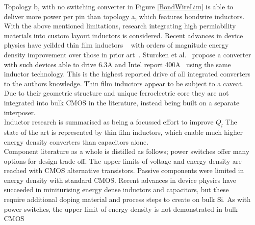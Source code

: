 \documentclass[letterpaper,twocolumn,10pt]{article}
\begin{document}
Topology b, with no switching converter in Figure \ref{BondWireLim} is able to deliver more power per pin than topology a, which features bondwire inductors.\\
\indent With the above mentioned limitations, research integrating high permiability materials into custom layout inductors is considered. Recent advances in device physics have yeilded thin film inductors ~\cite{OSulivan2013} with orders of magnitude energy density improvement over those in prior art~\cite{Meere2009}. Sturcken et al.~\cite{Sturcken2013} propose a converter with such devices able to drive 6.3A and Intel report 400A~\cite{Intel2010} using the same inductor technology. This is the highest reported drive of all integrated converters to the authors knowledge. Thin film inductors appear to be subject to a caveat. Due to their geometric structure and unique ferroelectric core they are not integrated into bulk CMOS in the literature, instead being built on a separate interposer.\\
\indent Inductor research is summarised as being a focussed effort to improve $Q_l$ The state of the art is represented by thin film inductors, which enable much higher energy density converters than capacitors alone.\\


\indent Component literature as a whole is distilled as follows; power switches offer many options for design trade-off. The upper limits of voltage and energy density are reached with CMOS alternative transistors. Passive components were limited in energy density with standard CMOS. Recent advances in device physics have succeeded in miniturising energy dense inductors and capacitors, but these require additional doping material and process steps to create on bulk Si. As with power switches, the upper limit of energy density is not demonstrated in bulk CMOS\\
\end{document}
